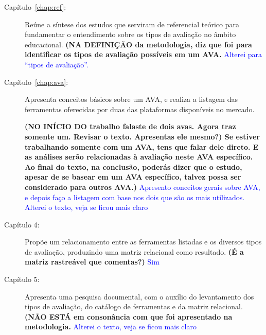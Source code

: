 \begin{description}
\item[Capítulo~\ref{chap:ref}:] Reúne a síntese dos estudos que serviram de referencial teórico para fundamentar o entendimento sobre os tipos de avaliação no âmbito educacional.\textbf{ (NA DEFINIÇÃO da metodologia, diz que foi para identificar os tipos de avaliação possíveis em um AVA.} \textcolor{blue}{Alterei para ``tipos de avaliação''.}

\item[Capítulo~\ref{chap:ava}:] Apresenta conceitos básicos sobre um  \acrfull{AVA}, e realiza a listagem das ferramentas oferecidas por duas das plataformas disponíveis no mercado. 

\textbf{(NO INÍCIO DO trabalho falaste de dois avas. Agora traz somente um. Revisar o texto. Apresentas ele mesmo?) Se estiver trabalhando somente com um AVA, tens que falar dele direto. E as análises serão relacionadas à avaliação neste AVA específico. Ao final do texto, na conclusão, poderás dizer que o estudo, apesar de se basear em um AVA específico, talvez possa ser considerado para outros AVA.)} \textcolor{blue}{Apresento conceitos gerais sobre AVA, e depois faço a listagem com base nos dois que são os mais utilizados. Alterei o texto, veja se ficou mais claro}

\item[Capítulo 4:] Propõe um relacionamento entre as ferramentas listadas e os diversos tipos de avaliação, produzindo uma matriz relacional como resultado. \textbf{(É a matriz rastreável que comentas?)} \textcolor{blue}{Sim}



\item[Capítulo 5:] Apresenta uma pesquisa documental, com o auxílio do levantamento dos tipos de avaliação, do catálogo de ferramentas e da matriz relacional. \textbf{(NÃO ESTÁ em consonância com que foi apresentado na metodologia.} \textcolor{blue}{Alterei o texto, veja se ficou mais claro}


\end{description}
